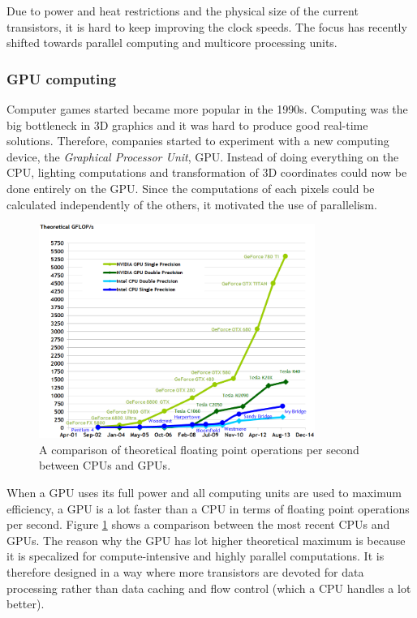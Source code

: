 Due to power and heat restrictions and the physical size of the current transistors, it is hard to keep improving the clock speeds. The focus has recently shifted towards parallel computing and multicore processing units.

\subsubsection{GPU computing}

Computer games started became more popular in the 1990s. Computing was the big bottleneck in 3D graphics and it was hard to produce good real-time solutions. Therefore, companies started to experiment with a new computing device, the \emph{Graphical Processor Unit}, GPU. Instead of doing everything on the CPU, lighting computations and transformation of 3D coordinates could now be done entirely on the GPU. Since the computations of each pixels could be calculated independently of the others, it motivated the use of parallelism. 

\begin{figure}[ht!]
\centering
\includegraphics[width=90mm]{img/flops.png}
\caption{A comparison of theoretical floating point operations per second between CPUs and GPUs.}
\label{flops}
\end{figure}

When a GPU uses its full power and all computing units are used to maximum efficiency, a GPU is a lot faster than a CPU in terms of floating point operations per second. Figure \ref{flops} shows a comparison between the most recent CPUs and GPUs. The reason why the GPU has lot higher theoretical maximum is because it is specalized for compute-intensive and highly parallel computations. It is therefore designed in a way where more transistors are devoted for data processing rather than data caching and flow control (which a CPU handles a lot better). 
